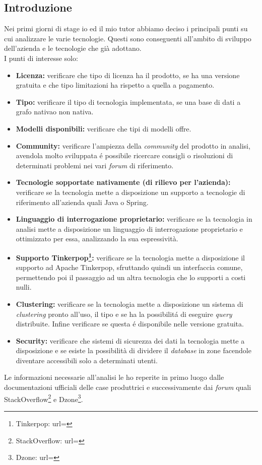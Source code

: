 \subsection{Introduzione}
Nei primi giorni di stage io ed il mio tutor abbiamo deciso i principali punti su cui analizzare le varie tecnologie. Questi sono conseguenti all'ambito di sviluppo dell'azienda e le tecnologie che già adottano.\\
I punti di interesse solo:
\begin{itemize}
\item{\textbf{Licenza:}} verificare che tipo di licenza ha il prodotto, se ha una versione gratuita e che tipo limitazioni ha rispetto a quella a pagamento.
\item{\textbf{Tipo:}} verificare il tipo di tecnologia implementata, se una base di dati a \gls{grafo nativa}o \gls{non nativa}.
\item{\textbf{Modelli disponibili:}} verificare che tipi di \gls{modelli} offre.
\item{\textbf{Community:}} verificare l'ampiezza della \textit{community} del prodotto in analisi, avendola molto sviluppata é possibile ricercare consigli o risoluzioni di determinati problemi nei vari \textit{forum} di riferimento.
\item{\textbf{Tecnologie sopportate nativamente (di rilievo per l'azienda):}} verificare se la tecnologia mette a disposizione un supporto a tecnologie di riferimento all'azienda quali Java o Spring.
\item{\textbf{Linguaggio di interrogazione proprietario:}} verificare se la tecnologia in analisi mette a disposizione un linguaggio di interrogazione proprietario e ottimizzato per essa, analizzando la sua espressività.
\item{\textbf{Supporto Tinkerpop\footnote{Tinkerpop: url= }:}} verificare se la tecnologia mette a disposizione il supporto ad Apache Tinkerpop, sfruttando quindi un interfaccia comune, permettendo poi il passaggio ad un altra tecnologia che lo supporti a costi nulli.
\item{\textbf{\gls{Clustering}:}} verificare se la tecnologia mette a disposizione un sistema di \textit{clustering} pronto all'uso, il tipo e se ha la possibilitá di eseguire \textit{query} distribuite. Infine verificare se questa é disponibile nelle versione gratuita.
\item{\textbf{Security:}} verificare che sistemi di sicurezza dei dati la tecnologia mette a disposizione e se esiste la possibilità di dividere il \textit{database} in zone facendole diventare accessibili solo a determinati utenti.\\

\end{itemize}
Le informazioni necessarie all'analisi le ho reperite in primo luogo dalle documentazioni ufficiali delle case produttrici e successivamente dai \textit{forum} quali StackOverflow\footnote{StackOverflow: url= } e Dzone\footnote{Dzone: url= }.
